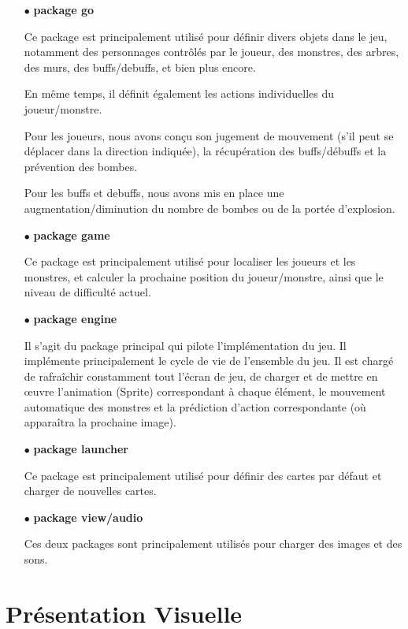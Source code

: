 \documentclass[11pt,english]{article}
\begin{document}
\begin{itemize}
    \item [$\bullet$] \textbf{package go}
    
    Ce package est principalement utilisé pour définir divers objets dans le jeu, notamment des personnages contrôlés par le joueur, des monstres, des arbres, des murs, des buffs/debuffs, et bien plus encore.
    
    En même temps, il définit également les actions individuelles du joueur/monstre. 

    Pour les joueurs, nous avons conçu son jugement de mouvement (s'il peut se déplacer dans la direction indiquée), la récupération des buffs/débuffs et la prévention des bombes.

    Pour les buffs et debuffs, nous avons mis en place une augmentation/diminution du nombre de bombes ou de la portée d'explosion.

    \item [$\bullet$] \textbf{package game}
    
    Ce package est principalement utilisé pour localiser les joueurs et les monstres, et calculer la prochaine position du joueur/monstre, ainsi que le niveau de difficulté actuel.

    \item [$\bullet$] \textbf{package engine}
    
    Il s'agit du package principal qui pilote l'implémentation du jeu. Il implémente principalement le cycle de vie de l’ensemble du jeu. Il est chargé de rafraîchir constamment tout l'écran de jeu, de charger et de mettre en œuvre l'animation (Sprite) correspondant à chaque élément, le mouvement automatique des monstres et la prédiction d'action correspondante (où apparaîtra la prochaine image).

    \item [$\bullet$] \textbf{package launcher}
    
    Ce package est principalement utilisé pour définir des cartes par défaut et charger de nouvelles cartes.

    \item [$\bullet$] \textbf{package view/audio}
    
    Ces deux packages sont principalement utilisés pour charger des images et des sons.
    

\end{itemize}

\section{Présentation Visuelle}
\end{document}
